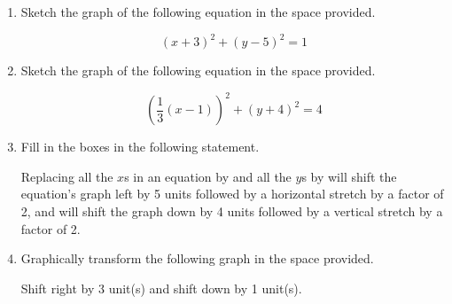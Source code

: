 \documentclass{article}
\begin{document}
\ActivityTitle[class={College Algebra}, number={2}, name={Transformations}]

\begin{enumerate}
\item Sketch the graph of the following equation in the space provided.

\[ (x + 3)^2 + (y - 5)^2 = 1 \]

\begin{center}
\CartesianPlane[axes=yes, h=7, w=7]
\end{center} \vspace{1cm}

\item Sketch the graph of the following equation in the space provided.

\[ \left(\frac{1}{3}(x - 1)\right)^2 + (y + 4)^2 = 4 \]

\begin{center}
\CartesianPlane[axes=yes, h=7, w=7]
\end{center} \vspace{1cm}

\newpage

\item Fill in the boxes in the following statement.

Replacing all the $x$s in an equation by \framebox{\begin{minipage}{3cm} \hfill\vspace{1cm} \end{minipage}} and all the $y$s by \framebox{\begin{minipage}{3cm} \hfill\vspace{1cm} \end{minipage}} will shift the equation's graph left by 5 units followed by a horizontal stretch by a factor of 2, and will shift the graph down by 4 units followed by a vertical stretch by a factor of 2.

   \vspace{3cm}

\item Graphically transform the following graph in the space provided.

\begin{center}
Shift right by 3 unit(s) and shift down by 1 unit(s).
\end{center}

\begin{center}
\MiniGraph[gadget=circle]
\end{center}


\end{enumerate}
\end{document}
